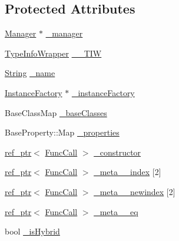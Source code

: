 \subsection*{Protected Attributes}
\begin{DoxyCompactItemize}
\item 
\hyperlink{classSLB_1_1Manager}{Manager} $\ast$ \hyperlink{classSLB_1_1ClassInfo_a10d7b8666bfc512e2c42c4dbcca5a756}{\+\_\+manager}
\item 
\hyperlink{classSLB_1_1TypeInfoWrapper}{Type\+Info\+Wrapper} \hyperlink{classSLB_1_1ClassInfo_ac595d97083fc7f5b24179aa924361e57}{\+\_\+\+\_\+\+T\+IW}
\item 
\hyperlink{namespaceSLB_a6a4c36e7004d99c0535c2c91c200c9a1}{String} \hyperlink{classSLB_1_1ClassInfo_a96abb0f63b7591a5bb1398ca8340e383}{\+\_\+name}
\item 
\hyperlink{structSLB_1_1InstanceFactory}{Instance\+Factory} $\ast$ \hyperlink{classSLB_1_1ClassInfo_a9554b221251069927245be8d69877d8d}{\+\_\+instance\+Factory}
\item 
Base\+Class\+Map \hyperlink{classSLB_1_1ClassInfo_a10f185f28c4a887b3fc70d55272023f8}{\+\_\+base\+Classes}
\item 
Base\+Property\+::\+Map \hyperlink{classSLB_1_1ClassInfo_aca934d887b4f2a249401a1d679f9cea8}{\+\_\+properties}
\item 
\hyperlink{classSLB_1_1ref__ptr}{ref\+\_\+ptr}$<$ \hyperlink{classSLB_1_1FuncCall}{Func\+Call} $>$ \hyperlink{classSLB_1_1ClassInfo_abb7480f2f69ce603ad6dd960daed22b4}{\+\_\+constructor}
\item 
\hyperlink{classSLB_1_1ref__ptr}{ref\+\_\+ptr}$<$ \hyperlink{classSLB_1_1FuncCall}{Func\+Call} $>$ \hyperlink{classSLB_1_1ClassInfo_a89fdf6bc6bcea6d0c1faa006e83c8d70}{\+\_\+meta\+\_\+\+\_\+index} \mbox{[}2\mbox{]}
\item 
\hyperlink{classSLB_1_1ref__ptr}{ref\+\_\+ptr}$<$ \hyperlink{classSLB_1_1FuncCall}{Func\+Call} $>$ \hyperlink{classSLB_1_1ClassInfo_a01c4b37eb7546b9429a36e13fe8270c1}{\+\_\+meta\+\_\+\+\_\+newindex} \mbox{[}2\mbox{]}
\item 
\hyperlink{classSLB_1_1ref__ptr}{ref\+\_\+ptr}$<$ \hyperlink{classSLB_1_1FuncCall}{Func\+Call} $>$ \hyperlink{classSLB_1_1ClassInfo_a41417cb29aef1320928cee5586c873ca}{\+\_\+meta\+\_\+\+\_\+eq}
\item 
bool \hyperlink{classSLB_1_1ClassInfo_a7b7f8091a85a5f089c595e41067bf844}{\+\_\+is\+Hybrid}
\end{DoxyCompactItemize}
